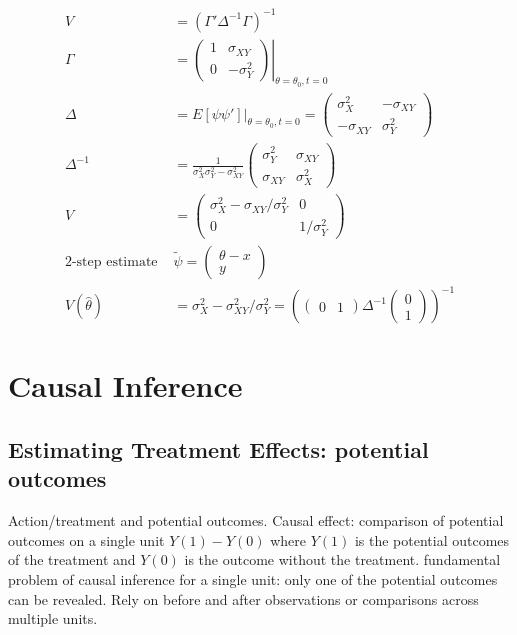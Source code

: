 \documentclass[11pt, a4paper, oneside]{article}
\theoremstyle{definition}
\theoremstyle{proposition}
\theoremstyle{corollary}
\theoremstyle{lemma}
\theoremstyle{theorem}
\begin{document}
\begin{align*}
V&=(\Gamma'\Delta^{-1}\Gamma)^{-1}\\
\Gamma &=\left.\begin{pmatrix} 1 & \sigma_{XY} \\ 0 & -\sigma_Y^2\end{pmatrix}\right |_{\theta=\theta_0, t=0}\\
\Delta & =\left.E[\psi\psi']\right |_{\theta=\theta_0, t=0} = \begin{pmatrix} \sigma_X^2 & -\sigma_{XY} \\ -\sigma_{XY} & \sigma_Y^2\end{pmatrix}\\
\Delta^{-1} &=\frac{1}{\sigma_X^2\sigma^2_Y-\sigma_{XY}^2} \begin{pmatrix} \sigma_Y^2 & \sigma_{XY} \\ \sigma_{XY} & \sigma_X^2\end{pmatrix}\\
V & = \begin{pmatrix} \sigma_X^2 - \sigma_{XY}/\sigma_Y^2 & 0 \\ 0 & 1/\sigma_Y^2\end{pmatrix} \\
\text{2-step estimate } & \tilde{\psi} =\begin{pmatrix} \theta - x \\ y \end{pmatrix} \\
V(\hat{\theta}) & = \sigma_X^2 - \sigma_{XY}^2/\sigma_Y^2 =(\begin{pmatrix} 0 & 1 \end{pmatrix}\Delta^{-1}\begin{pmatrix} 0 \\ 1 \end{pmatrix})^{-1}
\end{align*}

\section{Causal Inference}

\subsection{Estimating Treatment Effects: potential outcomes}
Action/treatment and potential outcomes. Causal effect: comparison of potential outcomes on a single unit $Y(1) - Y(0)$ where $Y(1)$ is the potential outcomes of the treatment and $Y(0)$ is the outcome without the treatment. fundamental problem of causal inference for a single unit: only one of the potential outcomes can be revealed. Rely on before and after observations or comparisons across multiple units. 
\end{document}
